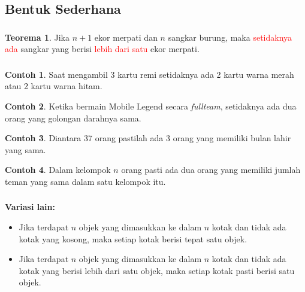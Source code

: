 \documentclass[aspectratio=169]{beamer}
\theoremstyle{definition}
\newtheorem{teorema}{Teorema}
\newtheorem{contoh}{Contoh}
\begin{document}
\subsection{Bentuk Sederhana}
\begin{frame}
  \frametitle{\insertsection}
  \framesubtitle{\insertsubsection}
  \begin{teorema}
    Jika $n+1$ ekor merpati dan $n$ sangkar burung, maka \textcolor{red}{setidaknya ada} sangkar yang berisi \textcolor{red}{lebih dari satu} ekor merpati. 
  \end{teorema}
\end{frame}

\begin{frame}
  \frametitle{\insertsection}
  \framesubtitle{\insertsubsection}
  \begin{contoh}
    Saat mengambil 3 kartu remi setidaknya ada 2 kartu warna merah atau 2 kartu warna hitam.
  \end{contoh}
  \begin{contoh}
    Ketika bermain Mobile Legend secara \textit{fullteam}, setidaknya ada dua orang yang golongan darahnya sama.
  \end{contoh}
  \begin{contoh}
    Diantara 37 orang pastilah ada 3 orang yang memiliki bulan lahir yang sama. 
  \end{contoh}
  \begin{contoh}
    Dalam kelompok $n$ orang pasti ada dua orang yang memiliki jumlah teman yang sama dalam satu kelompok itu.
  \end{contoh}
\end{frame}

\begin{frame}
  \frametitle{\insertsection}
  \framesubtitle{\insertsubsection}
  \textbf{Variasi lain:}
\begin{itemize}
  \item Jika terdapat \( n \) objek yang dimasukkan ke dalam \( n \) kotak dan tidak ada kotak yang kosong, maka setiap kotak berisi tepat satu objek.
  
  \item Jika terdapat \( n \) objek yang dimasukkan ke dalam \( n \) kotak dan tidak ada kotak yang berisi lebih dari satu objek, maka setiap kotak pasti berisi satu objek.
\end{itemize}
\end{frame}
\end{document}
